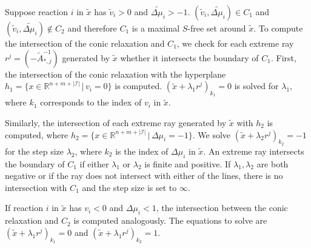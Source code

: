 Suppose reaction $i$ in $\tilde x$ has $\tilde v_i >0$ and $\tilde{\Delta \mu_i} >-1$. $(\tilde v_i, \tilde{\Delta \mu_i}) \in C_1$ and $(\tilde v_i, \tilde{\Delta \mu_i}) \not \in C_2$ and therefore $C_1$ is a maximal $S$-free set around $\tilde x$.
To compute the intersection of the conic relaxation and $C_1$, we check for each extreme ray $r^j = (- \tilde A^{-1}_{*,j})$ generated by $\tilde x$ whether it intersects the boundary of $C_1$. 
First, the intersection of the conic relaxation with the hyperplane $h_1 = \{ x \in \mathbb{R}^{n + m + |\mathcal{I}|} \, | \, v_i = 0 \} $ is computed. $(\tilde x + \lambda_1 r^j)_{k_1} = 0$ is solved for $\lambda_1$, where $k_1$ corresponds to the index of $v_i$ in $\tilde x$.

Similarly, the intersection of each extreme ray generated by $\tilde x$ with $h_2$ is computed, where $h_2 = \{ x \in \mathbb{R}^{n + m + |\mathcal{I}|} \, | \, \Delta \mu_i = -1 \}$. We solve $(\tilde x + \lambda_2 r^j)_{k_2} = -1$ for the step size $\lambda_2$, where $k_2$ is the index of $\Delta \mu_i$ in $\tilde x$. 
An extreme ray intersects the boundary of $C_1$ if either $\lambda_1$ or $\lambda_2$ is finite and positive. If $\lambda_1, \lambda_2$ are both negative or if the ray does not intersect with either of the lines, there is no intersection with $C_1$ and the step size is set to $\infty$. 

If reaction $i$ in $\tilde x$ has $v_i <0$ and $\Delta \mu_i <1$, the intersection between the conic relaxation and $C_2$ is computed analogously. The equations to solve are $(\tilde x + \lambda_1 r^j)_{k_1} = 0$ and $(\tilde x + \lambda_1 r^j)_{k_2} = 1$.

